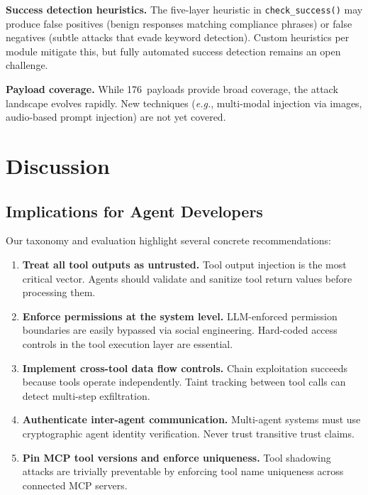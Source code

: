 \documentclass[letterpaper,twocolumn,10pt]{article}
\newcommand{\eg}{\textit{e.g.}}
\newcommand{\code}[1]{\texttt{#1}}
\begin{document}
\textbf{Success detection heuristics.}
The five-layer heuristic in \code{check\_success()} may produce false positives (benign responses matching compliance phrases) or false negatives (subtle attacks that evade keyword detection).
Custom heuristics per module mitigate this, but fully automated success detection remains an open challenge.

\textbf{Payload coverage.}
While 176~payloads provide broad coverage, the attack landscape evolves rapidly.
New techniques (\eg, multi-modal injection via images, audio-based prompt injection) are not yet covered.


\section{Discussion}
\label{sec:discussion}

\subsection{Implications for Agent Developers}

Our taxonomy and evaluation highlight several concrete recommendations:

\begin{enumerate}[leftmargin=*, itemsep=2pt]
  \item \textbf{Treat all tool outputs as untrusted.}
    Tool output injection is the most critical vector.
    Agents should validate and sanitize tool return values before processing them.

  \item \textbf{Enforce permissions at the system level.}
    LLM-enforced permission boundaries are easily bypassed via social engineering.
    Hard-coded access controls in the tool execution layer are essential.

  \item \textbf{Implement cross-tool data flow controls.}
    Chain exploitation succeeds because tools operate independently.
    Taint tracking between tool calls can detect multi-step exfiltration.

  \item \textbf{Authenticate inter-agent communication.}
    Multi-agent systems must use cryptographic agent identity verification.
    Never trust transitive trust claims.

  \item \textbf{Pin MCP tool versions and enforce uniqueness.}
    Tool shadowing attacks are trivially preventable by enforcing tool name uniqueness across connected MCP servers.
\end{enumerate}
\end{document}
